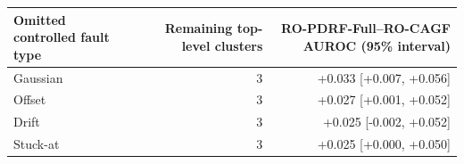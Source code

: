 \begin{tabular}{lrr}
\toprule
Omitted controlled fault type & Remaining top-level clusters & RO-PDRF-Full--RO-CAGF AUROC (95\% interval) \\
\midrule
Gaussian & 3 & +0.033 [+0.007, +0.056] \\
Offset & 3 & +0.027 [+0.001, +0.052] \\
Drift & 3 & +0.025 [-0.002, +0.052] \\
Stuck-at & 3 & +0.025 [+0.000, +0.050] \\
\bottomrule
\end{tabular}